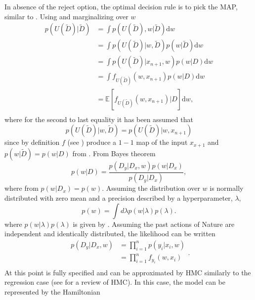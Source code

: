 In absence of the reject option, the optimal decision rule is to pick the MAP, similar to . Using  and marginalizing over $w$
\begin{equation}
	\begin{split}
		p(U(\tilde{D})|\tilde{D}) &= \int p(U(\tilde{D}),w|\tilde{D}) \mathrm{d}w \\
		& = \int p(U(\tilde{D})|w,\tilde{D})  p(w|\tilde{D})\mathrm{d}w \\
		& = \int p(U(\tilde{D})|x_{n+1},w)  p(w|D)\mathrm{d}w \\
		& = \int f_{U(\tilde{D})}(w,x_{n+1})  p(w|D)\mathrm{d}w \\
		& = \mathbb{E}[f_{U(\tilde{D})}(w,x_{n+1})|D]\mathrm{d}w,\\
	\end{split}
	\label{eq:q5}
\end{equation}
where for the second to last equality it has been assumed that
\begin{equation}
	p(U(\tilde{D})|w,\tilde{D}) = p(U(\tilde{D})|w,x_{n+1})
\end{equation}
since by definition $f$ (see ) produce a $1-1$ map of the input $x_{x+1}$ and $p(w|\tilde{D}) = p(w|D)$ from . From Bayes theorem
\begin{equation}
	p(w|D) =\frac{p(D_y|D_x,w)p(w|D_x)}{p(D_y|D_x)},
\end{equation}
where from  $p(w|D_x) = p(w)$. Assuming the distribution over $w$ is normally distributed with zero mean and a precision described by a hyperparameter, $\lambda$, 
\begin{equation}
	p(w) = \int d\lambda p(w|\lambda)p(\lambda).
\end{equation}
where $p(w|\lambda)p(\lambda)$ is given by . Assuming the past actions of Nature are independent and identically distributed, the likelihood can be written~\citep{Fischer1999} 
\begin{equation}
	\begin{split}
		p(D_y|D_x,w) &=\prod_{i=1}^{n}p(y_i|x_i,w)\\
		&=\prod_{i=1}^{n}f_{y_i}(w,x_i)\\
	\end{split}.
	\label{lik}
\end{equation}
At this point  is fully specified and can be approximated by HMC similarly to the regression case (see  for a review of HMC). In this case, the model can be represented by the Hamiltonian 
